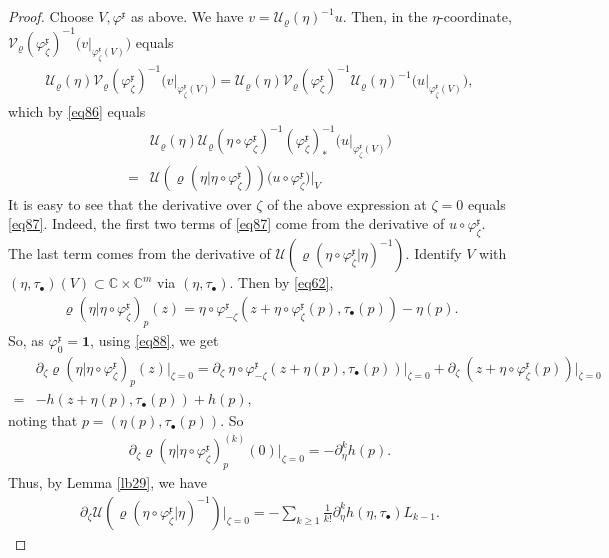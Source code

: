 \documentclass[12pt,b5paper,notitlepage]{report}
\theoremstyle{definition}
\theoremstyle{plain}
\newcommand{\fk}{\mathfrak}
\newcommand{\mc}{\mathcal}
\newcommand{\id}{\mathbf{1}}
\newcommand{\xk}{\mathfrak x}
\newcommand{\blt}{\bullet}
\newcommand{\Cbb}{\mathbb C}
\numberwithin{equation}{section}
\begin{document}
\begin{proof}
Choose $V,\varphi^{\fk x}$ as above. We have $v=\mc U_\varrho(\eta)^{-1}u$. Then, in the $\eta$-coordinate, $\mc V_\varrho(\varphi^{\fk x}_\zeta)^{-1}\big(v\big|_{\varphi^{\fk x}_\zeta(V)}\big)$ equals
\begin{align*}
\mc U_\varrho(\eta)\mc V_\varrho(\varphi^{\fk x}_\zeta)^{-1}\big(v\big|_{\varphi^{\fk x}_\zeta(V)}\big)=\mc U_\varrho(\eta)\mc V_\varrho(\varphi^{\fk x}_\zeta)^{-1}\mc U_\varrho(\eta)^{-1}\big(u\big|_{\varphi^{\fk x}_\zeta(V)}\big),
\end{align*}
which by \eqref{eq86}  equals
\begin{align*}
&\mc U_\varrho(\eta)\mc U_\varrho(\eta\circ\varphi^{\fk x}_\zeta)^{-1}(\varphi^{\fk x}_\zeta)_*^{-1}\big(u\big|_{\varphi^{\fk x}_\zeta(V)}\big)\\
=&\mc U(\varrho(\eta|\eta\circ\varphi^\xk_\zeta))\big(u\circ\varphi^{\fk x}_\zeta\big)\big|_V
\end{align*}
It is easy to see that the derivative over  $\zeta$ of the above expression at $\zeta=0$ equals \eqref{eq87}. Indeed, the first two terms of \eqref{eq87} come from the derivative of $u\circ\varphi^{\fk x}_\zeta$. The last term comes from the derivative of $\mc U(\varrho(\eta\circ\varphi_\zeta^{\fk x}|\eta)^{-1})$. Identify $V$ with $(\eta,\tau_\blt)(V)\subset\Cbb\times\Cbb^m$ via $(\eta,\tau_\blt)$. Then by \eqref{eq62},  
\begin{align*}
\varrho(\eta|\eta\circ\varphi^\xk_\zeta)_p(z)=\eta\circ\varphi_{-\zeta}^\xk(z+\eta\circ\varphi_\zeta^\xk(p),\tau_\blt(p))-\eta(p).
\end{align*}
So, as $\varphi^\xk_0=\id$, using \eqref{eq88}, we get
\begin{align*}
&\partial_\zeta\varrho(\eta|\eta\circ\varphi^\xk_\zeta)_p(z)\big|_{\zeta=0}=\partial_\zeta~\eta\circ\varphi_{-\zeta}^\xk(z+\eta(p),\tau_\blt(p))\big|_{\zeta=0}+\partial_\zeta~(z+\eta\circ\varphi_\zeta^\xk(p))\big|_{\zeta=0}\\
=&-h(z+\eta(p),\tau_\blt(p))+h(p),
\end{align*}
noting that $p=(\eta(p),\tau_\blt(p))$. So
\begin{align*}
\partial_\zeta\varrho(\eta|\eta\circ\varphi^\xk_\zeta)^{(k)}_p(0)\big|_{\zeta=0}=-\partial_\eta^k h(p).
\end{align*}
Thus, by Lemma \ref{lb29}, we have
\begin{align*}
\partial_\zeta\mc U(\varrho(\eta\circ\varphi_\zeta^{\fk x}|\eta)^{-1})\big|_{\zeta=0}=-\sum_{k\geq 1}\frac 1{k!}\partial_\eta^k h(\eta,\tau_\blt)L_{k-1}.
\end{align*}
\end{proof}
\end{document}
